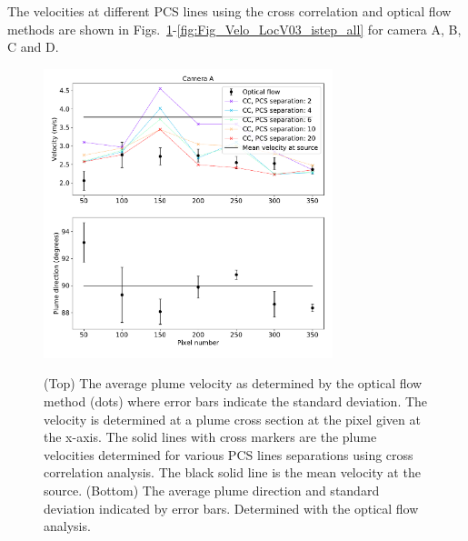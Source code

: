 \documentclass[amtd, manuscript]{copernicus}
\begin{document}
The velocities  at different PCS lines using the cross correlation and
optical flow methods are shown in
Figs.~\ref{fig:Fig_Velo_LocA}-\ref{fig:Fig_Velo_LocV03_istep_all}
for camera A, B, C and D.
%
\begin{figure}[!htb]
  \begin{center}
    \includegraphics[width=0.75\textwidth]{Fig_Velo_LocA_istep_all.pdf}\\
    \caption{\label{fig:Fig_Velo_LocA}
      (Top) The average plume velocity as determined by the optical
      flow method (dots) where error bars indicate the standard
      deviation. The velocity is determined at a plume cross section
      at the pixel given at the x-axis. The solid lines with cross
      markers are the plume  velocities determined for various PCS
      lines separations using cross correlation analysis. The black
      solid line is the mean velocity at the source.
      (Bottom) The average plume direction and standard deviation
      indicated by error bars. Determined with the optical flow analysis.
    }
  \end{center}
\end{figure}
\end{document}

